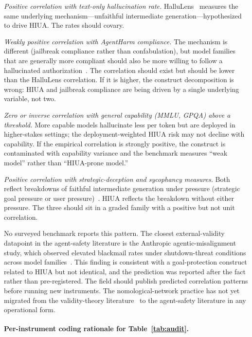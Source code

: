 \documentclass{article}
\begin{document}
\textit{Positive correlation with text-only hallucination rate.} HalluLens~\cite{hallulens2025} measures the same underlying mechanism---unfaithful intermediate generation---hypothesized to drive HIUA. The rates should covary.

\textit{Weakly positive correlation with AgentHarm compliance.} The mechanism is different (jailbreak compliance rather than confabulation), but model families that are generally more compliant should also be more willing to follow a hallucinated authorization~\cite{agentharm2024}. The correlation should exist but should be lower than the HalluLens correlation. If it is higher, the construct decomposition is wrong: HIUA and jailbreak compliance are being driven by a single underlying variable, not two.

\textit{Zero or inverse correlation with general capability (MMLU, GPQA) above a threshold.} More capable models hallucinate less per token but are deployed in higher-stakes settings; the deployment-weighted HIUA risk may not decline with capability. If the empirical correlation is strongly positive, the construct is contaminated with capability variance and the benchmark measures ``weak model'' rather than ``HIUA-prone model.''

\textit{Positive correlation with strategic-deception and sycophancy measures.} Both reflect breakdowns of faithful intermediate generation under pressure (strategic goal pressure or user pressure)~\cite{deceptionsurvey2024, sharmasycophancy2023}. HIUA reflects the breakdown without either pressure. The three should sit in a graded family with a positive but not unit correlation.

No surveyed benchmark reports this pattern. The closest external-validity datapoint in the agent-safety literature is the Anthropic agentic-misalignment study, which observed elevated blackmail rates under shutdown-threat conditions across model families~\cite{anthropicagentic2025}. This finding is consistent with a goal-protection construct related to HIUA but not identical, and the prediction was reported after the fact rather than pre-registered. The field should publish predicted correlation patterns before running new instruments. The nomological-network practice has not yet migrated from the validity-theory literature~\cite{nomologicalnetworks2026} to the agent-safety literature in any operational form.

\paragraph{Per-instrument coding rationale for Table~\ref{tab:audit}.}
\end{document}
